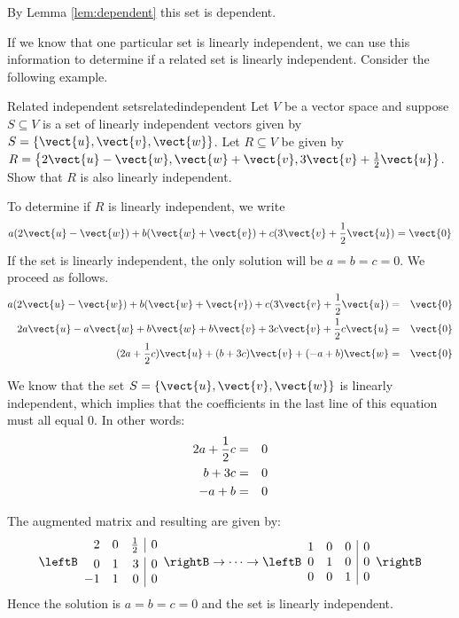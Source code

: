 By Lemma \ref{lem:dependent} this set is dependent. 

If we know that one particular set is linearly independent, we can use this information to determine if a related set is linearly independent. Consider the following example.

\begin{example}{Related independent sets}{relatedindependent}
Let $V$ be a vector space and suppose $S \subseteq V$ is a set of linearly independent vectors given by $S = \left\{ \vect{u}, \vect{v}, \vect{w} \right\}$. Let $R \subseteq V$ be given by $R = \left\{ 2\vect{u} - \vect{w}, \vect{w} + \vect{v}, 3\vect{v} + \frac{1}{2} \vect{u} \right\}$. Show that $R$ is also linearly independent. 
\end{example}

\begin{solution}
To determine if $R$ is linearly independent, we write 
\[
a(2\vect{u} - \vect{w}) + b(\vect{w} + \vect{v}) + c( 3\vect{v} + \vspace{0.05in}\frac{1}{2}\vect{u}) = \vect{0} \]
If the set is linearly independent, the only solution will be $a=b=c=0$. We proceed as follows.  
\begin{eqnarray*}
a(2\vect{u} - \vect{w}) + b(\vect{w} + \vect{v}) + c( 3\vect{v} + \vspace{0.05in}\frac{1}{2} \vect{u}) &=& \vect{0} \\
2a\vect{u} - a\vect{w} + b\vect{w} + b\vect{v}  + 3c\vect{v} + \vspace{0.05in}\frac{1}{2}c\vect{u} &=& \vect{0}\\
(2a + \vspace{0.05in}\frac{1}{2}c) \vect{u} + (b+3c)\vect{v} + (-a + b) \vect{w} &=& \vect{0}
\end{eqnarray*}

We know that the set $S = \left\{ \vect{u}, \vect{v}, \vect{w} \right\}$ is linearly independent, which implies that the coefficients in the last line of this equation must all equal $0$. 
In other words:
\begin{eqnarray*}
2a + \vspace{0.05in}\frac{1}{2} c &=& 0 \\
b + 3c &=& 0 \\
-a + b &=& 0 
\end{eqnarray*}

The augmented matrix and resulting {\rref} are given by:
\[
\leftB \begin{array}{rrr|r}
2 & 0 & \vspace{0.05in}\frac{1}{2} & 0 \\
0 & 1 & 3 & 0 \\
-1 & 1 & 0 & 0 
\end{array}\rightB
\rightarrow \cdots \rightarrow
\leftB \begin{array}{rrr|r}
1 & 0 & 0 & 0 \\
0 & 1 & 0 & 0 \\
0 & 0 & 1 & 0 
\end{array}\rightB
\]
Hence the solution is $a=b=c=0$ and the set is linearly independent. 
\end{solution}


